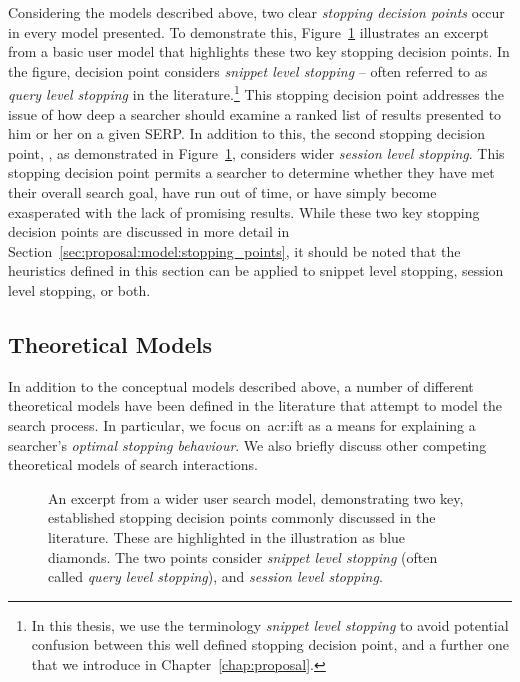 \noindent
{}
Considering the models described above, two clear \emph{stopping decision points} occur in every model presented. To demonstrate this, Figure~\ref{fig:model_two_points} illustrates an excerpt from a basic user model that highlights these two key stopping decision points. In the figure, decision point  considers \emph{snippet level stopping} -- often referred to as \emph{query level stopping} in the literature.\footnote{In this thesis, we use the terminology \emph{snippet level stopping} to avoid potential confusion between this well defined stopping decision point, and a further one that we introduce in Chapter~\ref{chap:proposal}.} This stopping decision point addresses the issue of how deep a searcher should examine a ranked list of results presented to him or her on a given SERP. In addition to this, the second stopping decision point, , as demonstrated in Figure~\ref{fig:model_two_points}, considers wider \emph{session level stopping}. This stopping decision point permits a searcher to determine whether they have met their overall search goal, have run out of time, or have simply become exasperated with the lack of promising results. While these two key stopping decision points are discussed in more detail in Section~\ref{sec:proposal:model:stopping_points}, it should be noted that the heuristics defined in this section can be applied to snippet level stopping, session level stopping, or both.

\subsection{Theoretical Models}
In addition to the conceptual models described above, a number of different theoretical models have been defined in the literature that attempt to model the search process. In particular, we focus on~\gls{acr:ift} as a means for explaining a searcher's \emph{optimal stopping behaviour}. We also briefly discuss other competing theoretical models of search interactions.

\begin{figure}[t!]
    \centering
    \caption[Two main stopping decision points of the search process]{An excerpt from a wider user search model, demonstrating two key, established stopping decision points commonly discussed in the literature. These are highlighted in the illustration as {\color{dmax_lightblue}blue} diamonds. The two points consider  \emph{snippet level stopping} (often called \emph{query level stopping}), and  \emph{session level stopping}.}
    \label{fig:model_two_points}
\end{figure}

